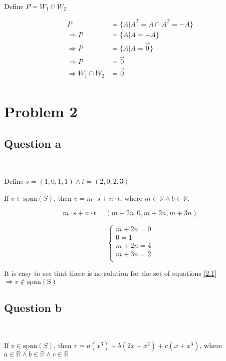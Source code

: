 \documentclass{article}
\def\R{\mathbb{R}}
\begin{document}
~

Define $P = W_1\cap W_2$

\begin{equation}
\tag{1.3.2}
\begin{split}
P &= \{A | A^T=A \cap A^T=-A\}\\
\Rightarrow P &= \{A|A=-A\}\\
\Rightarrow P &= \{A|A=\overrightarrow{0}\}\\
\Rightarrow P &= \overrightarrow{0}\\
\Rightarrow W_1\cap W_2 &= \overrightarrow{0}\\
\end{split}
\end{equation}

\newpage

\section{Problem 2}

\subsection{Question a}

~

Define $s=(1,0,1,1)\land t=(2,0,2,3)$

If $v \in \mathrm{span}(S)$, then $v = m\cdot s+n\cdot t$, where $m\in \R\land b\in\R$.

$$
m\cdot s+n\cdot t = (m+2n,0,m+2n,m+3n)
$$

\begin{equation}
\label{2.1}
\tag{2.1}
\begin{cases}
m+2n=0\\
0=1\\
m+2n=4\\
m+3n=2\\
\end{cases}
\end{equation}

It is easy to see that there is no solution for the set of equations \ref{2.1} $\Rightarrow v\notin \mathrm{span(S)}$

\subsection{Question b}

~

If $v\in \mathrm{span}(S)$, then $v=a(x^3)+b(2x+x^2)+c(x+x^3)$, where $a\in \R\land b\in\R\land c\in\R$
\end{document}
